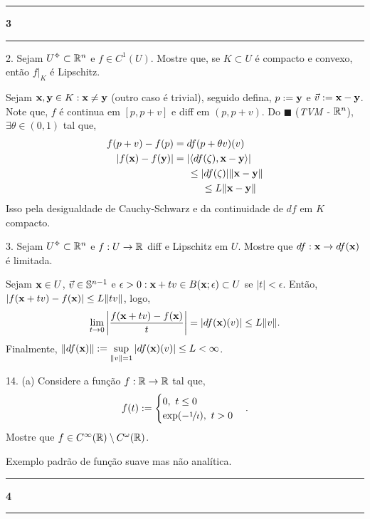 \-\vspace{-0.3cm}
  {\hrule \vspace{-0.15cm}
  \centering \textbf{3} \vspace{0.1cm}
  \hrule}

2. Sejam \(U\ab \subset \R^n\) e \(f \in C^1(U)\). Mostre que, se \(K\subset U\) é compacto e convexo, então \(f|_K\) é Lipschitz.  

\textcolor{gris}{
    Sejam \(\textbf{x}, \textbf{y} \in K : \textbf{x} \neq \textbf{y}\) (outro caso é trivial), seguido defina, \(p := \textbf{y}\) e \(\vec{v}:= \textbf{x} - \textbf{y}\). Note que, \(f \) é continua em \([p , p +v]\) e diff em \((p, p+v)\). Do \(\blacksquare\) (\emph{TVM - \(\mathbb{R}^n\)}), \(\exists \theta \in (0,1) \) tal que,  
    \begin{align*}
        f(p+v) - f(p) &= df(p + \theta v) (v) \\ 
        |f(\textbf{x}) - f(\textbf{y})| &= |\langle df(\zeta) , \textbf{x} - \textbf{y}\rangle| \\ 
        &\hspace{0.5cm}\leq  |df(\zeta)|\| \textbf{x} - \textbf{y}\| \\ 
        & \hspace{1cm}\leq  L \|\textbf{x} - \textbf{y}\|  
    \end{align*}   
Isso pela desigualdade de Cauchy-Schwarz e da continuidade de \(df\) em \(K\) compacto.
}

3. Sejam \(U\ab\subset \R^n\) e \(f: U \to \mathbb{R}\) diff e Lipschitz em \(U\). Mostre que \(df : \textbf{x} \to df(\textbf{x})\) é limitada.  

\textcolor{gris}{
    Sejam \(\textbf{x} \in U\), \(\vec{v} \in \mathbb{S}^{n-1}\) e \(\epsilon > 0 : \textbf{x} + tv \in B(\textbf{x};\epsilon)\subset U\) se \(|t|< \epsilon\). Então, \(|f(\textbf{x} + tv) - f(\textbf{x}) | \leq L \|tv\|\), logo, 
    \[
        \lim_{t\to 0}\left|\frac{f(\textbf{x} + tv) - f(\textbf{x}) }{t}\right| = |df(\textbf{x})(v)| \leq L \|v\| .  
    \]
    Finalmente, \(\|df(\textbf{x})\| := \displaystyle\sup_{\|v\| = 1 } |df(\textbf{x})(v)| \leq L < \infty\). 
}

14. (a) Considere a função \(f: \mathbb{R} \to \mathbb{R} \) tal que, 
\[f(t) :=  \begin{cases}
 0, \ t \leq 0 \\ 
 \exp(-\nicefrac{1}{t}), \ t>0
\end{cases}.\] 
Mostre que \(f \in C^\infty (\mathbb{R})\setminus C^\omega(\mathbb{R})\). 

\textcolor{gris}{Exemplo padrão de função suave mas não analítica. }

\-\vspace{-0.3cm}
  {\hrule \vspace{-0.15cm}
  \centering \textbf{4} \vspace{0.1cm}
  \hrule}

